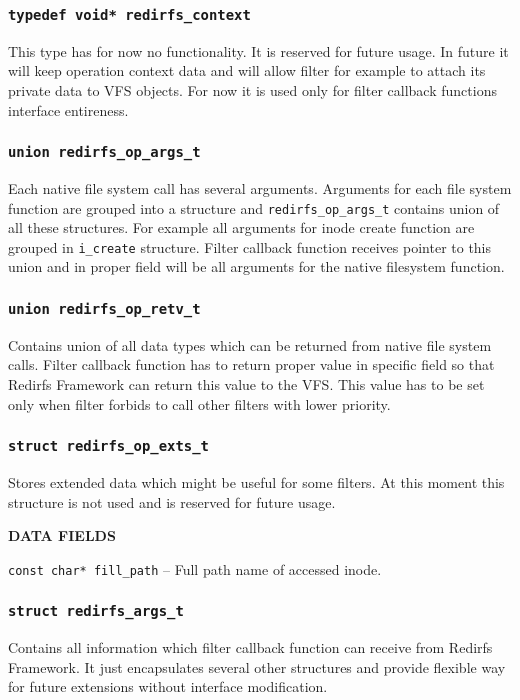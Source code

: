 \subsubsection{\texttt{typedef void* redirfs\_context}}
This type has for now no functionality. It is reserved for future usage. In future it
will keep operation context data and will allow filter for example to attach its private
data to VFS objects. For now it is used only for filter callback functions interface
entireness.

\subsubsection{\texttt{union redirfs\_op\_args\_t}}
Each native file system call has several arguments. Arguments for each file system
function are grouped into a structure and \texttt{redirfs\_op\_args\_t} contains union
of all these structures. For example all arguments for inode create function are
grouped in \texttt{i\_create} structure. Filter callback function receives pointer to
this union and in proper field will be all arguments for the native filesystem
function.

\subsubsection{\texttt{union redirfs\_op\_retv\_t}}
Contains union of all data types which can be returned from native file system calls.
Filter callback function has to return proper value in specific field so that Redirfs
Framework can return this value to the VFS. This value has to be set only when filter
forbids to call other filters with lower priority.

\subsubsection{\texttt{struct redirfs\_op\_exts\_t}}
Stores extended data which might be useful for some filters. At this moment this
structure is not used and is reserved for future usage.
\begin{list}{}{}
	\item \textbf{DATA FIELDS}
		\begin{list}{}{}
			\item \texttt{const char* fill\_path} -- Full path name of
				accessed inode.
		\end{list}
\end{list}

\subsubsection{\texttt{struct redirfs\_args\_t}}
Contains all information which filter callback function can receive from Redirfs
Framework. It just encapsulates several other structures and provide flexible way for
future extensions without interface modification.  

